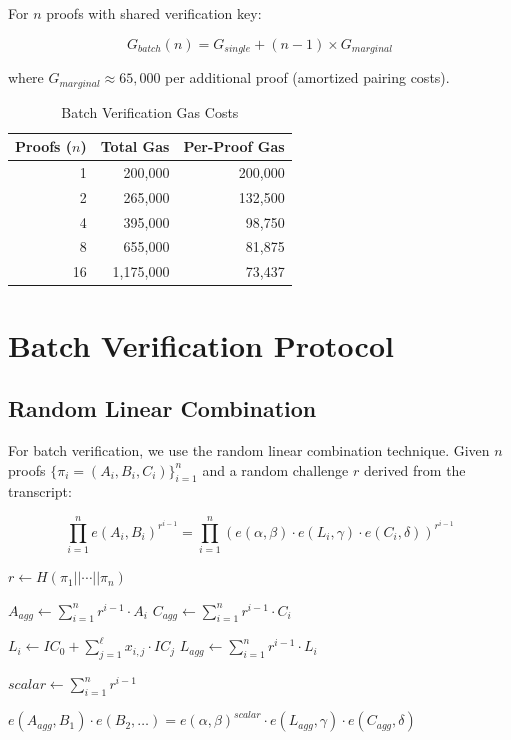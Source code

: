 \documentclass[11pt,a4paper]{article}
\theoremstyle{definition}
\begin{document}
For $n$ proofs with shared verification key:

\begin{equation}
G_{batch}(n) = G_{single} + (n-1) \times G_{marginal}
\end{equation}

where $G_{marginal} \approx 65,000$ per additional proof (amortized pairing costs).

\begin{table}[h]
\centering
\caption{Batch Verification Gas Costs}
\begin{tabular}{rrr}
\toprule
Proofs ($n$) & Total Gas & Per-Proof Gas \\
\midrule
1 & 200,000 & 200,000 \\
2 & 265,000 & 132,500 \\
4 & 395,000 & 98,750 \\
8 & 655,000 & 81,875 \\
16 & 1,175,000 & 73,437 \\
\bottomrule
\end{tabular}
\end{table}

\section{Batch Verification Protocol}

\subsection{Random Linear Combination}

For batch verification, we use the random linear combination technique. Given $n$ proofs $\{\pi_i = (A_i, B_i, C_i)\}_{i=1}^{n}$ and a random challenge $r$ derived from the transcript:

\begin{equation}
\prod_{i=1}^{n} e(A_i, B_i)^{r^{i-1}} = \prod_{i=1}^{n} \left( e(\alpha, \beta) \cdot e(L_i, \gamma) \cdot e(C_i, \delta) \right)^{r^{i-1}}
\end{equation}

\begin{algorithm}
\caption{Batch Groth16 Verification}
\begin{algorithmic}[1]
    \State $r \gets H(\pi_1 || \cdots || \pi_n)$ 

    \State $A_{agg} \gets \sum_{i=1}^{n} r^{i-1} \cdot A_i$
    \State $C_{agg} \gets \sum_{i=1}^{n} r^{i-1} \cdot C_i$

        \State $L_i \gets IC_0 + \sum_{j=1}^{\ell} x_{i,j} \cdot IC_j$
    \EndFor
    \State $L_{agg} \gets \sum_{i=1}^{n} r^{i-1} \cdot L_i$

    \State $scalar \gets \sum_{i=1}^{n} r^{i-1}$

    \State \Return $e(A_{agg}, B_1) \cdot e(B_2, \ldots) = e(\alpha, \beta)^{scalar} \cdot e(L_{agg}, \gamma) \cdot e(C_{agg}, \delta)$
\EndFunction
\end{algorithmic}
\end{algorithm}
\end{document}
